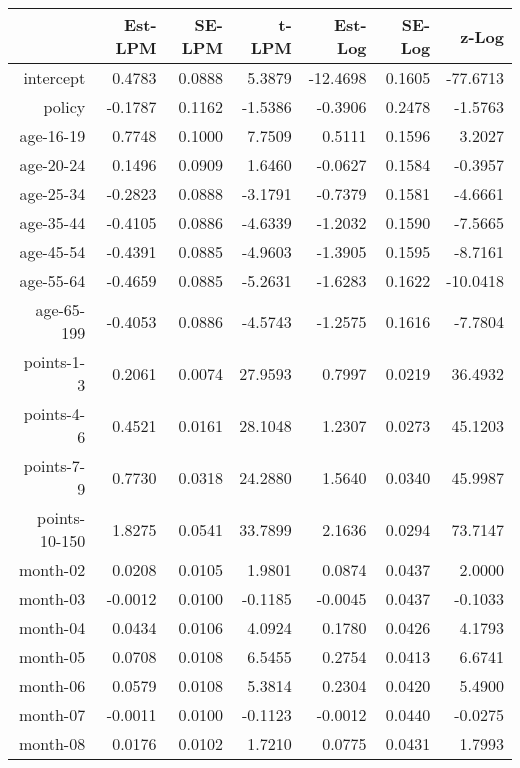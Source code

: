\documentclass[10pt]{article}
\begin{document}

\begin{table}[ht]
\centering
\begin{tabular}{rrrrrrr}
  \hline
 & Est-LPM & SE-LPM & t-LPM & Est-Log & SE-Log & z-Log \\ 
  \hline
intercept & 0.4783 & 0.0888 & 5.3879 & -12.4698 & 0.1605 & -77.6713 \\ 
  policy & -0.1787 & 0.1162 & -1.5386 & -0.3906 & 0.2478 & -1.5763 \\ 
  age-16-19 & 0.7748 & 0.1000 & 7.7509 & 0.5111 & 0.1596 & 3.2027 \\ 
  age-20-24 & 0.1496 & 0.0909 & 1.6460 & -0.0627 & 0.1584 & -0.3957 \\ 
  age-25-34 & -0.2823 & 0.0888 & -3.1791 & -0.7379 & 0.1581 & -4.6661 \\ 
  age-35-44 & -0.4105 & 0.0886 & -4.6339 & -1.2032 & 0.1590 & -7.5665 \\ 
  age-45-54 & -0.4391 & 0.0885 & -4.9603 & -1.3905 & 0.1595 & -8.7161 \\ 
  age-55-64 & -0.4659 & 0.0885 & -5.2631 & -1.6283 & 0.1622 & -10.0418 \\ 
  age-65-199 & -0.4053 & 0.0886 & -4.5743 & -1.2575 & 0.1616 & -7.7804 \\ 
  points-1-3 & 0.2061 & 0.0074 & 27.9593 & 0.7997 & 0.0219 & 36.4932 \\ 
  points-4-6 & 0.4521 & 0.0161 & 28.1048 & 1.2307 & 0.0273 & 45.1203 \\ 
  points-7-9 & 0.7730 & 0.0318 & 24.2880 & 1.5640 & 0.0340 & 45.9987 \\ 
  points-10-150 & 1.8275 & 0.0541 & 33.7899 & 2.1636 & 0.0294 & 73.7147 \\ 
  month-02 & 0.0208 & 0.0105 & 1.9801 & 0.0874 & 0.0437 & 2.0000 \\ 
  month-03 & -0.0012 & 0.0100 & -0.1185 & -0.0045 & 0.0437 & -0.1033 \\ 
  month-04 & 0.0434 & 0.0106 & 4.0924 & 0.1780 & 0.0426 & 4.1793 \\ 
  month-05 & 0.0708 & 0.0108 & 6.5455 & 0.2754 & 0.0413 & 6.6741 \\ 
  month-06 & 0.0579 & 0.0108 & 5.3814 & 0.2304 & 0.0420 & 5.4900 \\ 
  month-07 & -0.0011 & 0.0100 & -0.1123 & -0.0012 & 0.0440 & -0.0275 \\ 
  month-08 & 0.0176 & 0.0102 & 1.7210 & 0.0775 & 0.0431 & 1.7993 \\ 

\end{tabular}
\end{table}
\end{document}
